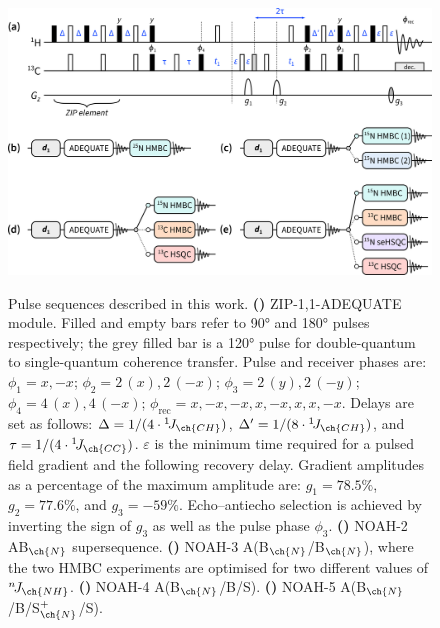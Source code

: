 \documentclass[a4paper,12pt]{article}
\newcommand{\carbon}{\ch{^{13}C}}
\newcommand{\nitrogen}{\ch{^{15}N}}
\newcommand{\onejch}{{}^1\!J_{\ch{CH}}}
\newcommand{\onejcc}{{}^1\!J_{\ch{CC}}}
\newcommand{\njnh}{{}^n\!J_{\ch{NH}}}
\newcommand{\abn}{NOAH-2 AB$_{\ch{N}}$}
\newcommand{\abnbn}{NOAH-3 A(B$_{\ch{N}}$/B$_{\ch{N}}$)}
\newcommand{\abnbs}{NOAH-4 A(B$_{\ch{N}}$/B/S)}
\newcommand{\abnbspns}{NOAH-5 A(B$_{\ch{N}}$/B/S$^{+}_{\ch{N}}$/S)}
\begin{document}
\begin{refsection}
\begin{figure}[ht]
    \centering
    \includegraphics[]{sequences.png}%
    {\label{fig:sequences_adequate}}
    {\label{fig:sequences_ab}}
    {\label{fig:sequences_abb}}
    {\label{fig:sequences_abbs}}
    {\label{fig:sequences_abbss}}
    \caption{
        Pulse sequences described in this work.
        \textbf{()} ZIP-1,1-ADEQUATE module.
        Filled and empty bars refer to \ang{90} and \ang{180} pulses respectively; the grey filled bar is a \ang{120} pulse for \carbon{} double-quantum to single-quantum coherence transfer\autocite{Mareci1982JMR}.
        Pulse and receiver phases are: $\phi_1 = x, -x$; $\phi_2 = 2\,(x), 2\,(-x)$; $\phi_3 = 2\,(y), 2\,(-y)$; $\phi_4 = 4\,(x), 4\,(-x)$; $\phi_\text{rec} = x, -x, -x, x, -x, x, x, -x$.
        Delays are set as follows: $\Delta = 1 / (4 \cdot \onejch)$, $\Delta' = 1 / (8 \cdot \onejch)$, and $\tau = 1 / (4 \cdot \onejcc)$. $\varepsilon$ is the minimum time required for a pulsed field gradient and the following recovery delay.
        Gradient amplitudes as a percentage of the maximum amplitude are: $g_1 = 78.5\%$, $g_2 = 77.6\%$, and $g_3 = -59\%$.
        Echo--antiecho selection is achieved by inverting the sign of $g_3$ as well as the pulse phase $\phi_3$.
        \textbf{()} \abn{} supersequence.
        \textbf{()} \abnbn{}, where the two \nitrogen{} HMBC experiments are optimised for two different values of $\njnh{}$.
        \textbf{()} \abnbs{}.
        \textbf{()} \abnbspns{}.
    }
    \label{fig:sequences}
\end{figure}


\end{refsection}
\end{document}
